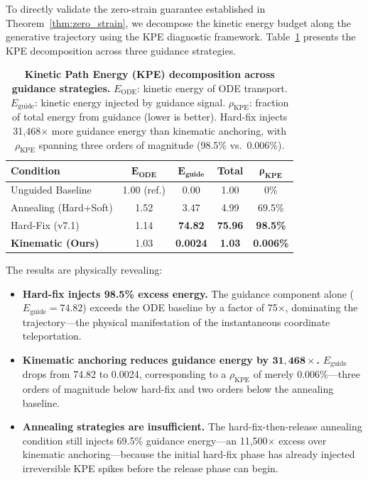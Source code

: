 \documentclass{article}
\newcommand{\KPERatio}{\ensuremath{\rho_{\text{KPE}}}}
\begin{document}
To directly validate the zero-strain guarantee established in
Theorem~\ref{thm:zero_strain}, we decompose the kinetic energy budget along
the generative trajectory using the KPE diagnostic framework.  Table~\ref{tab:kpe}
presents the KPE decomposition across three guidance strategies.

\begin{table}[H]
  \centering
  \caption{\textbf{Kinetic Path Energy (KPE) decomposition across guidance
           strategies.}  $E_{\text{ODE}}$: kinetic energy of ODE transport.
           $E_{\text{guide}}$: kinetic energy injected by guidance signal.
           $\KPERatio$: fraction of total energy from guidance (lower is
           better).  Hard-fix injects 31,468$\times$ more guidance energy
           than kinematic anchoring, with $\KPERatio$ spanning three orders
           of magnitude (98.5\% vs.\ 0.006\%).}
  \label{tab:kpe}
  \small
  \begin{tabular}{l c c c c}
    \toprule
    \textbf{Condition} & $\bm{E_{\text{ODE}}}$ & $\bm{E_{\text{guide}}}$ & \textbf{Total} & $\bm{\KPERatio}$ \\
    \midrule
    Unguided Baseline    & 1.00 (ref.) & 0.00          & 1.00          & 0\% \\
    Annealing (Hard+Soft)& 1.52        & 3.47          & 4.99          & 69.5\% \\
    Hard-Fix (v7.1)      & 1.14        & \textbf{74.82} & \textbf{75.96} & \textbf{98.5\%} \\
    \midrule
    \textbf{Kinematic (Ours)} & 1.03   & \textbf{0.0024} & \textbf{1.03} & \textbf{0.006\%} \\
    \bottomrule
  \end{tabular}
\end{table}

The results are physically revealing:

\begin{itemize}
  \item \textbf{Hard-fix injects 98.5\% excess energy.}  The guidance
    component alone ($E_{\text{guide}} = 74.82$) exceeds the ODE baseline
    by a factor of 75$\times$, dominating the trajectory---the physical
    manifestation of the instantaneous coordinate teleportation.
  \item \textbf{Kinematic anchoring reduces guidance energy by
    $\bm{31{,}468\times}$.}  $E_{\text{guide}}$ drops from 74.82 to 0.0024,
    corresponding to a $\KPERatio$ of merely 0.006\%---three orders of
    magnitude below hard-fix and two orders below the annealing baseline.
  \item \textbf{Annealing strategies are insufficient.}  The
    hard-fix-then-release annealing condition still injects 69.5\% guidance
    energy---an 11,500$\times$ excess over kinematic anchoring---because the
    initial hard-fix phase has already injected irreversible KPE spikes
    before the release phase can begin.
\end{itemize}
\end{document}
